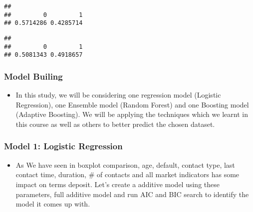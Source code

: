 \documentclass[
]{article}
\newenvironment{Shaded}{\begin{snugshade}}{\end{snugshade}}
\newcommand{\KeywordTok}[1]{\textcolor[rgb]{0.13,0.29,0.53}{\textbf{#1}}}
\newcommand{\NormalTok}[1]{#1}
\newcommand{\OperatorTok}[1]{\textcolor[rgb]{0.81,0.36,0.00}{\textbf{#1}}}
\providecommand{\tightlist}{%
  \setlength{\itemsep}{0pt}\setlength{\parskip}{0pt}}
\begin{document}
\begin{Shaded}
\end{Shaded}

\begin{verbatim}
## 
##         0         1 
## 0.5714286 0.4285714
\end{verbatim}

\begin{Shaded}
\end{Shaded}

\begin{verbatim}
## 
##         0         1 
## 0.5081343 0.4918657
\end{verbatim}

\hypertarget{model-builing}{%
\subsubsection{Model Builing}\label{model-builing}}

\begin{itemize}
\tightlist
\item
  In this study, we will be considering one regression model (Logistic
  Regression), one Ensemble model (Random Forest) and one Boosting model
  (Adaptive Boosting). We will be applying the techniques which we
  learnt in this course as well as others to better predict the chosen
  dataset.
\end{itemize}

\hypertarget{model-1-logistic-regression}{%
\subsubsection{Model 1: Logistic
Regression}\label{model-1-logistic-regression}}

\begin{itemize}
\tightlist
\item
  As We have seen in boxplot comparison, age, default, contact type,
  last contact time, duration, \# of contacts and all market indicators
  has some impact on terms deposit. Let's create a additive model using
  these parameters, full additive model and run AIC and BIC search to
  identify the model it comes up with.
\end{itemize}
\end{document}
